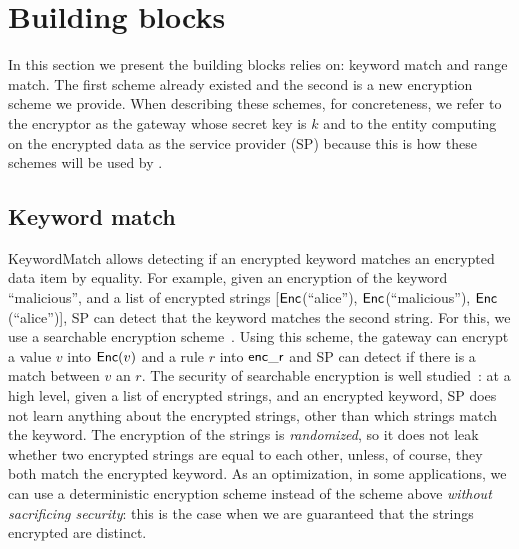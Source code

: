 


\section{Building blocks}

In this section we present the building blocks \sys relies on: keyword match and range match. The first scheme already existed and the second is a new encryption scheme we provide. 
When describing these schemes, for concreteness, we refer to the encryptor as the gateway whose secret key is $k$ and to the entity computing on the encrypted data as the service provider (SP) because this is how these schemes will be used by \sys.


\subsection{Keyword match}\label{s:kwmatch}


KeywordMatch allows detecting if an encrypted keyword matches an encrypted data item by equality.
For example, given an encryption of the keyword ``malicious'', and a list of encrypted strings  [$\mathsf{Enc}$(``alice''), $\mathsf{Enc}$(``malicious''), $\mathsf{Enc}$(``alice'')], SP can  detect that the keyword matches the second string. 
For  this, we use a searchable encryption scheme~\cite{song:search, blindbox}.
Using this scheme, the gateway can encrypt a value $v$ into $\mathsf{Enc}(v)$ and a rule $r$ into $\mathsf{enc\_r}$ and SP can detect if there is a match between $v$ an $r$. 
 The security of searchable encryption is well studied~\cite{song:search, blindbox}: at a high level,  given a list of encrypted strings, and an encrypted keyword, SP does not learn anything about the encrypted strings, other than which strings match the keyword. %
 The encryption of the strings is {\em randomized}, so it does not leak whether two encrypted strings are equal to each other, unless, of course, they both match the encrypted keyword. 
%
As an optimization, in some applications, we can use a deterministic encryption scheme instead of the scheme above {\em without sacrificing security}: this is the case when we are guaranteed that the strings encrypted are distinct. %



